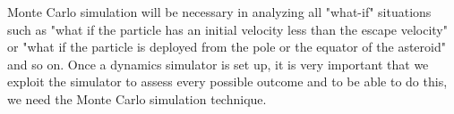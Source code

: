 Monte Carlo simulation will be necessary in analyzing all "what-if" situations such as "what if the particle has an initial velocity less than the escape velocity" or "what if the particle is deployed from the pole or the equator of the asteroid" and so on. Once a dynamics simulator is set up, it is very important that we exploit the simulator to assess every possible outcome and to be able to do this, we need the Monte Carlo simulation technique.
